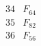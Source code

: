 \documentclass{article}
\begin{document}
{$$\begin{array}{|r|*{7}{r|}}
 & 
 & 
\\
\hline
34 
 & F_{64} &
 & 
 & 
 & 
 & 
 & 
\\
\hline
35 
 &  F_{82}&
 & 
 & 
 & 
 & 
 & 
\\
\hline
36 
 &  F_{56}&
 & 

\end{array}$$}
\end{document}
